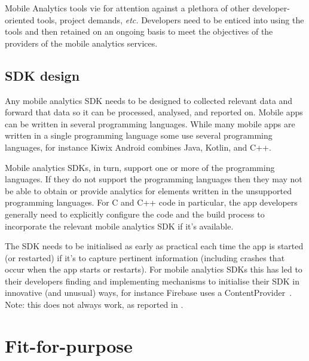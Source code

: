 Mobile Analytics tools vie for attention against a plethora of other developer-oriented tools, project demands, \emph{etc.} Developers need to be enticed into using the tools and then retained on an ongoing basis to meet the objectives of the providers of the mobile analytics services.

\subsection{SDK design}
Any mobile analytics SDK needs to be designed to collected relevant data and forward that data so it can be processed, analysed, and reported on. Mobile apps %
can be written in several programming languages. While many mobile apps are written in a single programming language some use several programming languages, for instance Kiwix Android combines Java, Kotlin, and C++. 

Mobile analytics SDKs, in turn, support one or more of the programming languages. If they do not support the programming languages then they may not be able to obtain or provide analytics for elements written in the unsupported programming languages. For C and C++ code in particular, the app developers generally need to explicitly configure the code and the build process to incorporate the relevant mobile analytics SDK if it's available.

The SDK needs to be initialised as early as practical each time the app is started (or restarted) if it's to capture pertinent information (including crashes that occur when the app starts or restarts). For mobile analytics SDKs this has led to their developers finding and implementing mechanisms to initialise their SDK in innovative (and unusual) ways, for instance Firebase uses a ContentProvider~\citep{stevenson2016_how_does_firebase_initialize_on_android}. Note: this does not always work, as reported in \citep{reddy2022_crashlytics_fails_to_track_app_startup_crashes}. 


\section{Fit-for-purpose}


